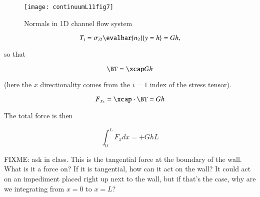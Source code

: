 \begin{figure}[htp]
   \centering
   \texttt{[image: continuumL11fig7]}
   \caption{Normals in 1D channel flow system}\label{fig:continuumL11:continuumL11fig7}
\end{figure}

\begin{equation}\label{eqn:continuumL11:770}
T_i = \sigma_{i 2} \evalbar{n_2}{y = h} = G h,
\end{equation}

so that

\begin{equation}\label{eqn:continuumL11:791}
\BT = \xcap G h
\end{equation}

(here the $x$ directionality comes from the $i = 1$ index of the stress tensor).

\begin{equation}\label{eqn:continuumL11:790}
F_{x_L} = \xcap \cdot \BT = G h
\end{equation}

The total force is then

\begin{equation}\label{eqn:continuumL11:810}
\int_0^L F_x dx = + G h L
\end{equation}

FIXME: ask in class.  This is the tangential force at the boundary of the wall.  What is it a force on?  If it is tangential, how can it act on the wall?  It could act on an impediment placed right up next to the wall, but if that's the case, why are we integrating from $x = 0$ to $x = L$?

\EndNoBibArticle
